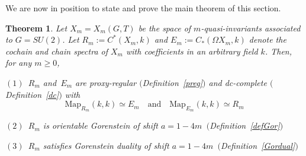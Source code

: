 \documentclass[11pt]{amsart}
\newtheorem{theorem}{Theorem}[section]
\theoremstyle{definition}
\theoremstyle{remark}
\numberwithin{equation}{section}
\newcommand{\la}{\label}
\newcommand{\Map}{\mathrm{Map}}
\begin{document}
\vspace*{1ex}

We are now in position to state and prove the main theorem of this section.
\begin{theorem}
\la{ThGor}
Let $ X_m = X_m(G,T) $ be the space of $m$-quasi-invariants associated to $ G = SU(2) $.
Let $ R_m := C^*(X_m, k) $ and $ E_m := C_*(\Omega X_m, k) $ denote the cochain and chain spectra
of $X_m$ with coefficients in an arbitrary field $k$.
Then, for any $ m \ge 0 $,

$(1)$ $\, R_m $ and $\, E_m $ are proxy-regular $($Definition~\ref{preg}$)$ and dc-complete $($Definition~\ref{dc}$)$ with
%
$$
\Map_{R_m}(k,k) \simeq E_m\quad \mbox{and}\quad\Map_{E_m}(k,k) \simeq R_m
$$
%

$(2)$ $\, R_m $ is orientable Gorenstein of shift $ a= 1- 4 m \,$ $($Definition~\ref{defGor}$)$

$(3)$ $\,R_m$ satisfies Gorenstein duality of shift $ a = 1-4m\,$ $($Definition~\ref{Gordual}$)$ 
\end{theorem}
%
\end{document}
